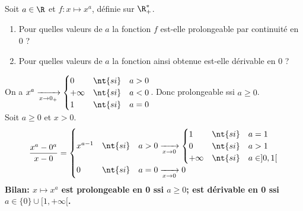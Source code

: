 \documentclass[11pt]{article}
\begin{document}
\pagebreak

\vspace*{0.4cm}

\begin{ex}{}{}
    Soit $a\in\R$ et $f:x\mapsto x^a$, définie sur $\R^*_+$.
    \begin{enumerate}
        \item Pour quelles valeurs de $a$ la fonction $f$ est-elle prolongeable par continuité en $0$ ?
        \item Pour quelles valeurs de $a$ la fonction ainsi obtenue est-elle dérivable en 0 ?
    \end{enumerate}
    \tcblower
     On a $x^a\xrightarrow[x\to0_+]{}\begin{cases}
        0 &\nt{si}\quad a>0\\
        +\infty &\nt{si}\quad a<0\\
        1 &\nt{si}\quad a=0
    \end{cases}$. Donc prolongeable ssi $a\geq0$.\\
     Soit $a\geq0$ et $x>0$.
    \begin{equation*}
        \frac{x^a-0^a}{x-0}=\begin{cases}
            x^{a-1} &\nt{si}\quad a > 0 \xrightarrow[x\to0]{}\begin{cases}
                1 &\nt{si} \quad a=1\\
                0 &\nt{si} \quad a>1\\
                +\infty &\nt{si} \quad a\in]0,1[
            \end{cases}\\
            0 &\nt{si} \quad a=0 \xrightarrow[x\to0]{}0
        \end{cases}
    \end{equation*}
    \bf{Bilan:} $x\mapsto x^a$ est prolongeable en 0 ssi $a\geq 0$; est dérivable en 0 ssi $a\in\{0\}\cup[1,+\infty[$.
\end{ex}

\vspace*{0.4cm}
\end{document}
